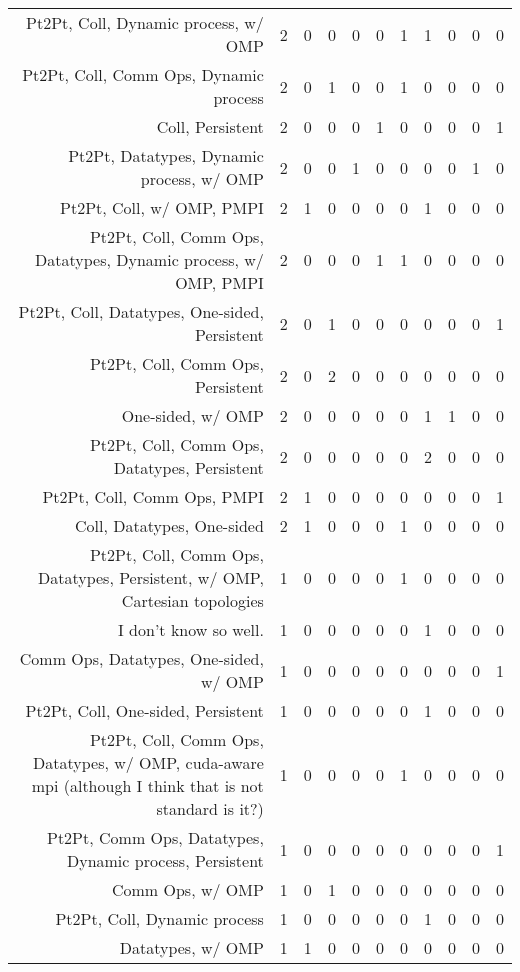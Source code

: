 {\begin{landscape}
\begin{longtable}[htb]{r|c|c|c|c|c|c|c|c|c|c}
{Pt2Pt, Coll, Dynamic process, w/ OMP} & 2 & 0 & 0 & 0 & 0 & 1 & 1 & 0 & 0 & 0 \\%
{Pt2Pt, Coll, Comm Ops, Dynamic process} & 2 & 0 & 1 & 0 & 0 & 1 & 0 & 0 & 0 & 0 \\%
{Coll, Persistent} & 2 & 0 & 0 & 0 & 1 & 0 & 0 & 0 & 0 & 1 \\%
{Pt2Pt, Datatypes, Dynamic process, w/ OMP} & 2 & 0 & 0 & 1 & 0 & 0 & 0 & 0 & 1 & 0 \\%
{Pt2Pt, Coll, w/ OMP, PMPI} & 2 & 1 & 0 & 0 & 0 & 0 & 1 & 0 & 0 & 0 \\%
{Pt2Pt, Coll, Comm Ops, Datatypes, Dynamic process, w/ OMP, PMPI} & 2 & 0 & 0 & 0 & 1 & 1 & 0 & 0 & 0 & 0 \\%
{Pt2Pt, Coll, Datatypes, One-sided, Persistent} & 2 & 0 & 1 & 0 & 0 & 0 & 0 & 0 & 0 & 1 \\%
{Pt2Pt, Coll, Comm Ops, Persistent} & 2 & 0 & 2 & 0 & 0 & 0 & 0 & 0 & 0 & 0 \\%
{One-sided, w/ OMP} & 2 & 0 & 0 & 0 & 0 & 0 & 1 & 1 & 0 & 0 \\%
{Pt2Pt, Coll, Comm Ops, Datatypes, Persistent} & 2 & 0 & 0 & 0 & 0 & 0 & 2 & 0 & 0 & 0 \\%
{Pt2Pt, Coll, Comm Ops, PMPI} & 2 & 1 & 0 & 0 & 0 & 0 & 0 & 0 & 0 & 1 \\%
{Coll, Datatypes, One-sided} & 2 & 1 & 0 & 0 & 0 & 1 & 0 & 0 & 0 & 0 \\%
{Pt2Pt, Coll, Comm Ops, Datatypes, Persistent, w/ OMP, Cartesian topologies} & 1 & 0 & 0 & 0 & 0 & 1 & 0 & 0 & 0 & 0 \\%
{I don't know so well.} & 1 & 0 & 0 & 0 & 0 & 0 & 1 & 0 & 0 & 0 \\%
{Comm Ops, Datatypes, One-sided, w/ OMP} & 1 & 0 & 0 & 0 & 0 & 0 & 0 & 0 & 0 & 1 \\%
{Pt2Pt, Coll, One-sided, Persistent} & 1 & 0 & 0 & 0 & 0 & 0 & 1 & 0 & 0 & 0 \\%
{Pt2Pt, Coll, Comm Ops, Datatypes, w/ OMP, cuda-aware mpi (although I think that is not standard is it?)} & 1 & 0 & 0 & 0 & 0 & 1 & 0 & 0 & 0 & 0 \\%
{Pt2Pt, Comm Ops, Datatypes, Dynamic process, Persistent} & 1 & 0 & 0 & 0 & 0 & 0 & 0 & 0 & 0 & 1 \\%
{Comm Ops, w/ OMP} & 1 & 0 & 1 & 0 & 0 & 0 & 0 & 0 & 0 & 0 \\%
{Pt2Pt, Coll, Dynamic process} & 1 & 0 & 0 & 0 & 0 & 0 & 1 & 0 & 0 & 0 \\%
{Datatypes, w/ OMP} & 1 & 1 & 0 & 0 & 0 & 0 & 0 & 0 & 0 & 0 \\%

\end{longtable}
\end{landscape}}
